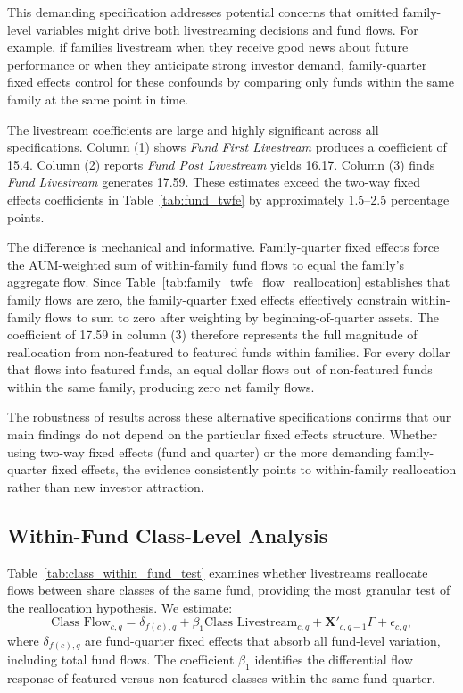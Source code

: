 \documentclass[12pt]{article}
\begin{document}
This demanding specification addresses potential concerns that omitted family-level variables might drive both livestreaming decisions and fund flows. For example, if families livestream when they receive good news about future performance or when they anticipate strong investor demand, family-quarter fixed effects control for these confounds by comparing only funds within the same family at the same point in time.

The livestream coefficients are large and highly significant across all specifications. Column (1) shows \textit{Fund First Livestream} produces a coefficient of 15.4. Column (2) reports \textit{Fund Post Livestream} yields 16.17. Column (3) finds \textit{Fund Livestream} generates 17.59. These estimates exceed the two-way fixed effects coefficients in Table~\ref{tab:fund_twfe} by approximately 1.5--2.5 percentage points.

The difference is mechanical and informative. Family-quarter fixed effects force the AUM-weighted sum of within-family fund flows to equal the family's aggregate flow. Since Table~\ref{tab:family_twfe_flow_reallocation} establishes that family flows are zero, the family-quarter fixed effects effectively constrain within-family flows to sum to zero after weighting by beginning-of-quarter assets. The coefficient of 17.59 in column (3) therefore represents the full magnitude of reallocation from non-featured to featured funds within families. For every dollar that flows into featured funds, an equal dollar flows out of non-featured funds within the same family, producing zero net family flows.

The robustness of results across these alternative specifications confirms that our main findings do not depend on the particular fixed effects structure. Whether using two-way fixed effects (fund and quarter) or the more demanding family-quarter fixed effects, the evidence consistently points to within-family reallocation rather than new investor attraction.

\subsection{Within-Fund Class-Level Analysis}\label{subsec:class_level}

Table~\ref{tab:class_within_fund_test} examines whether livestreams reallocate flows between share classes of the same fund, providing the most granular test of the reallocation hypothesis. We estimate:
\begin{equation}
    \label{eq:class_flow_appendix}
    \text{Class Flow}_{c,q} = \delta_{f(c),q} + \beta_1 \text{Class Livestream}_{c,q} + \mathbf{X}'_{c,q-1} \Gamma + \epsilon_{c,q},
\end{equation}
where $\delta_{f(c),q}$ are fund-quarter fixed effects that absorb all fund-level variation, including total fund flows. The coefficient $\beta_1$ identifies the differential flow response of featured versus non-featured classes within the same fund-quarter.
\end{document}
